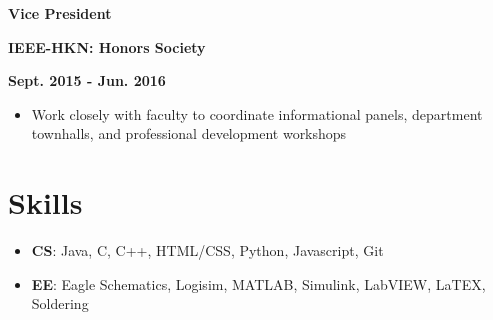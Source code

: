 \documentclass[12pt]{article}
\newcommand\textbox[1]{\parbox{.333\textwidth}{#1}}
\newcommand{\textlcr}[3]{\textbox{\textbf{#1}\hfill}\textbox{\hfil \textbf{#2}\hfil}\textbox{\hfill \textbf{#3}}}
\begin{document}
\textlcr{Vice President}{IEEE-HKN: Honors Society}{Sept. 2015 - Jun. 2016}
\begin{itemize}
\item Work closely with faculty to coordinate informational panels, department townhalls, and professional development workshops
\end{itemize}

\section*{Skills}
\vspace*{-1em}\makebox[\linewidth]{\rule{\textwidth}{0.4pt}}
\begin{itemize}
\item \textbf{CS}: Java, C, C++, HTML/CSS, Python, Javascript, Git
\item \textbf{EE}: Eagle Schematics, Logisim, MATLAB, Simulink, LabVIEW, LaTEX, Soldering
\end{itemize}
\end{document}
